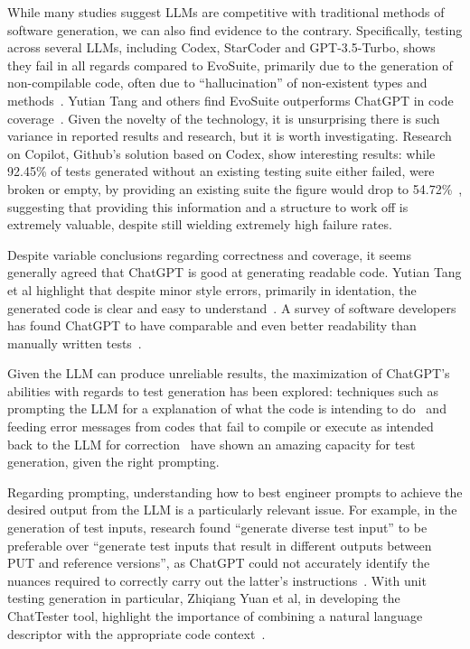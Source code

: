 While many studies suggest LLMs are competitive with traditional methods of software generation, we can also find evidence to the contrary. Specifically, testing across several LLMs, including Codex, StarCoder and GPT-3.5-Turbo, shows they fail in all regards compared to EvoSuite, primarily due to the generation of non-compilable code, often due to ``hallucination'' of non-existent types and methods~\cite{kn:siddiq2023empirical}. Yutian Tang and others find EvoSuite outperforms ChatGPT in code coverage~\cite{kn:tang2023chatgpt}. Given the novelty of the technology, it is unsurprising there is such variance in reported results and research, but it is worth investigating. Research on Copilot, Github's solution based on Codex, show interesting results: while 92.45\% of tests generated without an existing testing suite either failed, were broken or empty, by providing an existing suite the figure would drop to 54.72\%~\cite{kn:githubcopilot}, suggesting that providing this information and a structure to work off is extremely valuable, despite still wielding extremely high failure rates.

Despite variable conclusions regarding correctness and coverage, it seems generally agreed that ChatGPT is good at generating readable code. Yutian Tang et al highlight that despite minor style errors, primarily in identation, the generated code is clear and easy to understand~\cite{kn:tang2023chatgpt}. A survey of software developers has found ChatGPT to have comparable and even better readability than manually written tests~\cite{kn:chattester}.


Given the LLM can produce unreliable results, the maximization of ChatGPT's abilities with regards to test generation has been explored: techniques such as prompting the LLM for a explanation of what the code is intending to do~\cite{kn:nuances} and feeding error messages from codes that fail to compile or execute as intended back to the LLM for correction~\cite{kn:chattester} have shown an amazing capacity for test generation, given the right prompting.

Regarding prompting, understanding how to best engineer prompts to achieve the desired output from the LLM is a particularly relevant issue. For example, in the generation of test inputs, research found ``generate diverse test input'' to be preferable over ``generate test inputs that result in different outputs between PUT and reference versions'', as ChatGPT could not accurately identify the nuances required to correctly carry out the latter's instructions~\cite{kn:nuances}.
With unit testing generation in particular, Zhiqiang Yuan et al, in developing the ChatTester tool, highlight the importance of combining a natural language descriptor with the appropriate code context~\cite{kn:chattester}.

